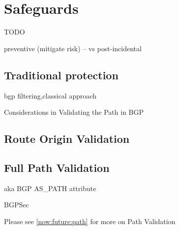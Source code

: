 
\section{Safeguards}
\label{protect}
TODO

preventive (mitigate risk) -- vs post-incidental


\subsection{Traditional protection}
\label{protect:filtering}
bgp filtering,classical approach

 Considerations in Validating the Path in BGP \cite{rfc5123}
\subsection{Route Origin Validation}
\label{protect:rov}

\subsection{Full Path Validation}
\label{protect:path}
aka {BGP} AS\_PATH attribute


BGPSec \cite{rfc8205} \cite{rfc8206}

Please see \ref{now:future:path} for more on Path Validation
